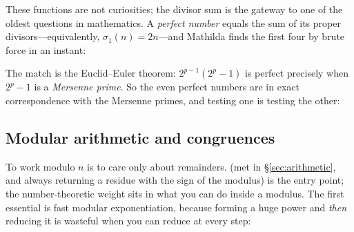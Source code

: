 
These functions are not curiosities; the divisor sum is the gateway to one of the oldest
questions in mathematics. A \emph{perfect number} equals the sum of
its proper divisors---equivalently, \(\sigma_1(n)=2n\)---and Mathilda finds the first four
by brute force in an instant:

\begin{codepairs}
\end{codepairs}

The match is the Euclid--Euler theorem: \(2^{p-1}(2^{p}-1)\) is perfect precisely when
\(2^{p}-1\) is a \emph{Mersenne prime}. So the even perfect numbers
are in exact correspondence with the Mersenne primes, and testing one is testing the
other:

\begin{codepairs}
\end{codepairs}

\subsection{Modular arithmetic and congruences}
\label{ssec:nt-modular}

To work modulo \(n\) is to care only about remainders.  (met in
\S\ref{sec:arithmetic}, and always returning a residue with the sign of the modulus) is
the entry point; the number-theoretic weight sits in what you can do inside a modulus. The
first essential is fast modular exponentiation, because forming a huge power and
\emph{then} reducing it is wasteful when you can reduce at every step:

\begin{codepairs}
\end{codepairs}

